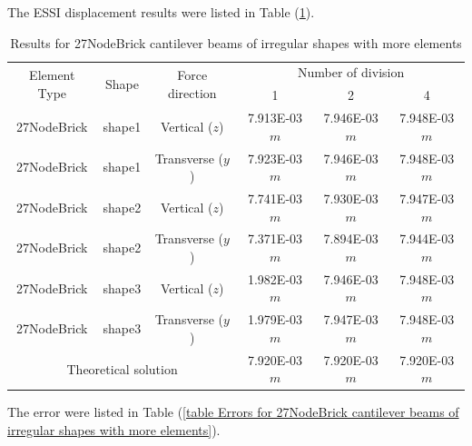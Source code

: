 \documentclass[fleqn,11pt,letter]{article}
\begin{document}
The ESSI displacement results were listed in Table (\ref{table Results for 27NodeBrick cantilever beams of irregular shapes with more elements}).
\begin{table}[H]
  \centering
  \caption{Results for 27NodeBrick cantilever beams of irregular shapes with more elements}
  \label{table Results for 27NodeBrick cantilever beams of irregular shapes with more elements}
\begin{tabular}{|c|c|c|c|c|c|}
\hline
\multirow{2}{*}{Element Type} & \multirow{2}{*}{Shape}  & \multirow{2}{*}{Force direction}  & \multicolumn{3}{|c|}{Number of division} \\  \cline{4-6}
                        &        &                  &  1 &  2 &  4  \\ \hline
27NodeBrick              & shape1 & Vertical ($z$)   & 7.913E-03 $m$ & 7.946E-03 $m$ & 7.948E-03  $m$ \\ \hline
27NodeBrick              & shape1 & Transverse ($y$) & 7.923E-03 $m$ & 7.946E-03 $m$ & 7.948E-03  $m$ \\ \hline
27NodeBrick              & shape2 & Vertical ($z$)   & 7.741E-03 $m$ & 7.930E-03 $m$ & 7.947E-03  $m$ \\ \hline
27NodeBrick              & shape2 & Transverse ($y$) & 7.371E-03 $m$ & 7.894E-03 $m$ & 7.944E-03  $m$ \\ \hline
27NodeBrick              & shape3 & Vertical ($z$)   & 1.982E-03 $m$ & 7.946E-03 $m$ & 7.948E-03  $m$ \\ \hline
27NodeBrick              & shape3 & Transverse ($y$) & 1.979E-03 $m$ & 7.947E-03 $m$ & 7.948E-03  $m$ \\ \hline
 \multicolumn{3}{|c|}{Theoretical solution}      & 7.920E-03 $m$  & 7.920E-03 $m$  & 7.920E-03  $m$ \\
\hline
\end{tabular}
\end{table}

The error were listed in Table (\ref{table Errors for 27NodeBrick cantilever beams of irregular shapes with more elements}). 
\end{document}
